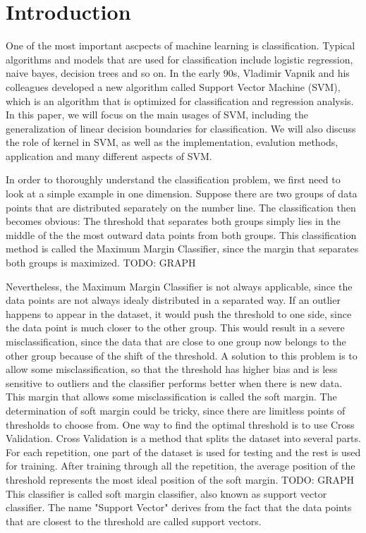
\section{Introduction}
One of the most important ascpects of machine learning is classification. Typical algorithms and models
that are used for classification include logistic regression, naive bayes, decision trees and so on. In the early 90s, 
Vladimir Vapnik and his colleagues developed a new algorithm called Support Vector Machine (SVM), which is an algorithm 
that is optimized for classification and regression analysis. In this paper,
we will focus on the main usages of SVM, including the generalization of linear decision boundaries for classification.
We will also discuss the role of kernel in SVM, as well as the implementation, evalution methods, application and many
different aspects of SVM.

In order to thoroughly understand the classification problem, we first need to look at a simple example in one dimension.
Suppose there are two groups of data points that are distributed separately on the number line. The classification then
becomes obvious: The threshold that separates both groups simply lies in the middle of the the most outward data points
from both groups. This classification method is called the Maximum Margin Classifier, since the margin that separates both
groups is maximized. TODO: GRAPH

Nevertheless, the Maximum Margin Classifier is not always applicable, since the data points are not always idealy distributed
in a separated way. If an outlier happens to appear in the dataset, it would push the threshold to one side, since the data point
is much closer to the other group. This would result in a severe misclassification, since the data that are close to one
group now belongs to the other group because of the shift of the threshold. A solution to this problem is to allow some
misclassification, so that the threshold has higher bias and is less sensitive to outliers and the classifier performs better
when there is new data. This margin that allows some misclassification is called the soft margin. 
The determination of soft margin 
could be tricky, since there are limitless points of thresholds to choose from. One way to find the optimal threshold
is to use Cross Validation. Cross Validation is a method that splits the dataset into several parts. For each repetition, 
one part of the dataset is used for testing and the rest is used for training. After training through all the repetition, the 
average position of the threshold represents the most ideal position of the soft margin. TODO: GRAPH This classifier is called
soft margin classifier, also known as support vector classifier. The name "Support Vector" derives from the fact that
the data points that are closest to the threshold are called support vectors.

